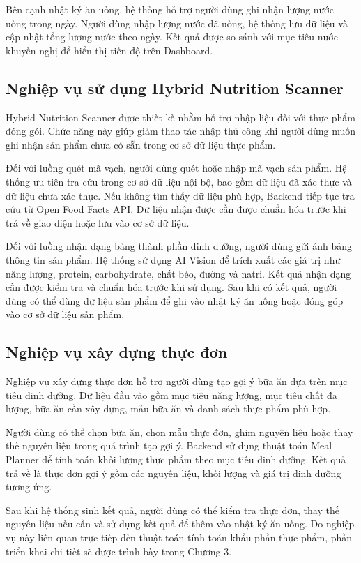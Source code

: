 \documentclass[12pt, a4paper]{report}
\begin{document}
Bên cạnh nhật ký ăn uống, hệ thống hỗ trợ người dùng ghi nhận lượng nước uống trong ngày. Người dùng nhập lượng nước đã uống, hệ thống lưu dữ liệu và cập nhật tổng lượng nước theo ngày. Kết quả được so sánh với mục tiêu nước khuyến nghị để hiển thị tiến độ trên Dashboard.

\subsection{Nghiệp vụ sử dụng Hybrid Nutrition Scanner}Hybrid Nutrition Scanner được thiết kế nhằm hỗ trợ nhập liệu đối với thực phẩm đóng gói. Chức năng này giúp giảm thao tác nhập thủ công khi người dùng muốn ghi nhận sản phẩm chưa có sẵn trong cơ sở dữ liệu thực phẩm.

Đối với luồng quét mã vạch, người dùng quét hoặc nhập mã vạch sản phẩm. Hệ thống ưu tiên tra cứu trong cơ sở dữ liệu nội bộ, bao gồm dữ liệu đã xác thực và dữ liệu chưa xác thực. Nếu không tìm thấy dữ liệu phù hợp, Backend tiếp tục tra cứu từ Open Food Facts API. Dữ liệu nhận được cần được chuẩn hóa trước khi trả về giao diện hoặc lưu vào cơ sở dữ liệu.

Đối với luồng nhận dạng bảng thành phần dinh dưỡng, người dùng gửi ảnh bảng thông tin sản phẩm. Hệ thống sử dụng AI Vision để trích xuất các giá trị như năng lượng, protein, carbohydrate, chất béo, đường và natri. Kết quả nhận dạng cần được kiểm tra và chuẩn hóa trước khi sử dụng. Sau khi có kết quả, người dùng có thể dùng dữ liệu sản phẩm để ghi vào nhật ký ăn uống hoặc đóng góp vào cơ sở dữ liệu sản phẩm.

\subsection{Nghiệp vụ xây dựng thực đơn}Nghiệp vụ xây dựng thực đơn hỗ trợ người dùng tạo gợi ý bữa ăn dựa trên mục tiêu dinh dưỡng. Dữ liệu đầu vào gồm mục tiêu năng lượng, mục tiêu chất đa lượng, bữa ăn cần xây dựng, mẫu bữa ăn và danh sách thực phẩm phù hợp.

Người dùng có thể chọn bữa ăn, chọn mẫu thực đơn, ghim nguyên liệu hoặc thay thế nguyên liệu trong quá trình tạo gợi ý. Backend sử dụng thuật toán Meal Planner để tính toán khối lượng thực phẩm theo mục tiêu dinh dưỡng. Kết quả trả về là thực đơn gợi ý gồm các nguyên liệu, khối lượng và giá trị dinh dưỡng tương ứng.

Sau khi hệ thống sinh kết quả, người dùng có thể kiểm tra thực đơn, thay thế nguyên liệu nếu cần và sử dụng kết quả để thêm vào nhật ký ăn uống. Do nghiệp vụ này liên quan trực tiếp đến thuật toán tính toán khẩu phần thực phẩm, phần triển khai chi tiết sẽ được trình bày trong Chương 3.
\end{document}
